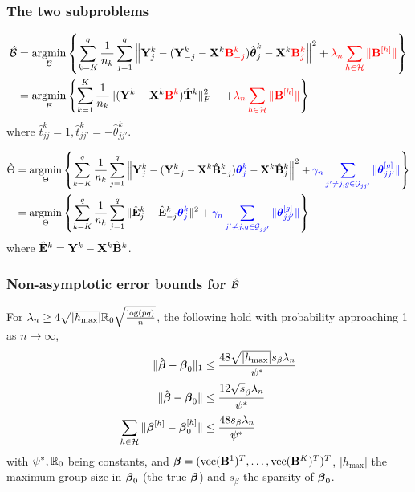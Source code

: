 \documentclass[10pt]{beamer}
\theoremstyle{definition}
\DeclareMathOperator*{\argmin}{argmin}
\DeclareMathOperator*{\ve}{vec}
\begin{document}
\begin{frame}
\frametitle{The two subproblems}
\begin{align*}
\hat \cB &=
\argmin_{\cB} \left\{
\sum_{k=K}^q \frac{1}{n_k} \sum_{j=1}^q
\left\| \bfY_j^k - ( \bfY_{-j}^k - \bfX^k {\colr \bfB_{-j}^k} ) \hat \bftheta_j^k
- \bfX^k {\colr \bfB_j^k} \right\|^2
+ {\colr \lambda_n \sum_{h \in \cH} \| \bfB^{[h]} \|} \right\}\\
&= \argmin_{\cB} \left\{ \sum_{k=1}^K \frac{1}{n_k}
\| (\bfY^k - \bfX^k {\colr \bfB^k}) \hat \bfT^k \|_F^2 +
+ {\colr \lambda_n \sum_{h \in \cH} \| \bfB^{[h]} \|} \right\}
\end{align*}
%
where $\hat t_{jj}^k = 1, \hat t_{jj'}^k = - \hat \theta_{jj'}^k$.

\begin{align*}
\hat \Theta &=
\argmin_{\Theta} \left\{ \sum_{k=K}^q \frac{1}{n_k} \sum_{j=1}^q
\left\| \bfY_j^k - ( \bfY_{-j}^k - \bfX^k \hat \bfB_{-j}^k) {\colb \bftheta_j^k}
- \bfX^k \hat \bfB_j^k \right\|^2 
+ {\colb \gamma_n \sum_{j' \neq j, g \in \cG_{jj'}} \| \bftheta_{jj'}^{[g]} \|} \right\}\\
&= \argmin_{\Theta} \left\{ 
\sum_{k=K}^q \frac{1}{n_k} \sum_{j=1}^q
\| \hat \bfE_j^k - \hat \bfE_{-j}^k {\colb \bftheta_j^k} \|^2
+ {\colb \gamma_n \sum_{j' \neq j, g \in \cG_{jj'}} \| \bftheta_{jj'}^{[g]} \|} \right\}
\end{align*}
%
where $\hat {{\mathbf{E}}}^k = {\mathbf{Y}}^k - {\mathbf{X}}^k \hat {{\mathbf{B}}}^k$.

\end{frame}


\begin{frame}
\frametitle{Non-asymptotic error bounds for $\hat {{\cal{B}}}$}

For $\lambda_n \geq 4 \sqrt{| h_{\max} |} {\mathbb{R}}_0 \sqrt{ \frac{ \log(pq)}{n}}$, the following hold with probability approaching 1 as $n \rightarrow \infty$,
%
\begin{align*}
\| \hat {{\boldsymbol{\beta}}} - {\boldsymbol{\beta}}_0 \|_1 & \leq \frac{48 \sqrt{ | h_{\max} |} s_\beta \lambda_n}{ \psi^*} \\
\| \hat {{\boldsymbol{\beta}}} - {\boldsymbol{\beta}}_0 \| & \leq \frac{12 \sqrt s_\beta \lambda_n}{ \psi^*} \\
\sum_{h \in {\cal{H}}} \| {\boldsymbol{\beta}}^{[h]} - {\boldsymbol{\beta}}_0^{[h]} \| & \leq \frac{48 s_\beta \lambda_n}{ \psi^*}
\end{align*}
%
with $\psi^*, {\mathbb{R}}_0$ being constants, and $\bfbeta = (\ve(\bfB^1)^T, \ldots, \ve(\bfB^K)^T)^T$, $| h_{\max} |$ the maximum group size in ${\boldsymbol{\beta}}_0$ (the true ${\boldsymbol{\beta}}$) and $s_\beta$ the sparsity of ${\boldsymbol{\beta}}_0$.
\end{frame}
\end{document}
